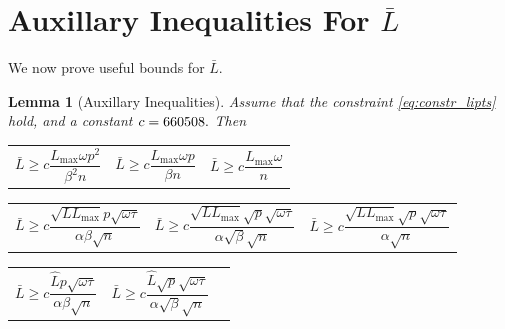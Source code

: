 \documentclass{article} %
\theoremstyle{plain}
\newtheorem{lemma}[theorem]{Lemma}
\theoremstyle{definition}
\theoremstyle{remark}
\begin{document}
\section{Auxillary Inequalities For $\bar{L}$}
\newcommand{\constlipt}{c}
We now prove useful bounds for $\bar{L}.$
\begin{lemma}[Auxillary Inequalities]
  \label{lemma:aux_ineq_L}
  Assume that the constraint \eqref{eq:constr_lipts} hold, and a constant $c = 660508.$ Then

  \begin{tabularx}{1.1\linewidth}{XXX}
  \begin{equation}
    \bar{L} \geq \constlipt \frac{L_{\max} \omega p^2}{\beta^2 n} \label{eq:lipt:max_2}
  \end{equation}
  &
  \begin{equation}
    \bar{L} \geq \constlipt \frac{L_{\max} \omega p}{\beta n} \label{eq:lipt:max_1}
  \end{equation}
  &
  \begin{equation}
    \bar{L} \geq \constlipt \frac{L_{\max} \omega}{n} \label{eq:lipt:max}
  \end{equation}
  \end{tabularx}
  \begin{tabularx}{1.1\linewidth}{XXX}
    \begin{equation}
      \bar{L} \geq \constlipt\frac{\sqrt{L L_{\max}} p \sqrt{\omega \tau}}{\alpha \beta \sqrt{n}} \label{eq:lipt:l_l_max_2}
    \end{equation}
    &
    \begin{equation}
      \bar{L} \geq \constlipt\frac{\sqrt{L L_{\max}} \sqrt{p} \sqrt{\omega \tau}}{\alpha \sqrt{\beta} \sqrt{n}} \label{eq:lipt:l_l_max_1}
    \end{equation}
    &
    \begin{equation}
      \bar{L} \geq \constlipt\frac{\sqrt{L L_{\max}} \sqrt{p} \sqrt{\omega \tau}}{\alpha \sqrt{n}} \label{eq:lipt:l_l_max_p}
    \end{equation}
  \end{tabularx}
  \begin{tabularx}{1.1\linewidth}{XXX}
    \begin{equation}
      \bar{L} \geq \constlipt\frac{\widehat{L} p \sqrt{\omega \tau}}{\alpha \beta \sqrt{n}} \label{eq:lipt:hat_2}
    \end{equation}
    &
    \begin{equation}
      \bar{L} \geq \constlipt\frac{\widehat{L} \sqrt{p} \sqrt{\omega \tau}}{\alpha \sqrt{\beta} \sqrt{n}} \label{eq:lipt:hat_1}

\end{equation}
\end{tabularx}
\end{lemma}
\end{document}
